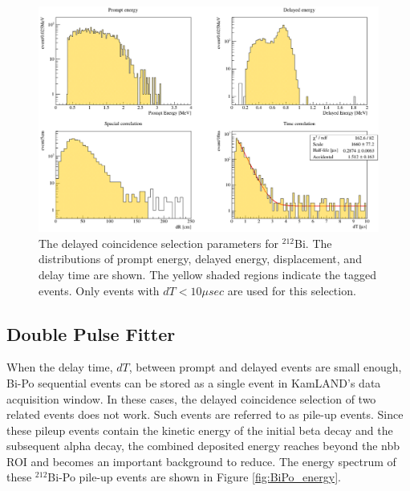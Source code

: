 \begin{figure}[htb]
	\centering
	\includegraphics[scale=0.45]{bi212.png}
	\caption{The delayed coincidence selection parameters for $^{212}$Bi. The distributions of prompt energy, delayed energy, displacement, and delay time are shown. The yellow shaded regions indicate the tagged events. Only events with $dT<10\mu sec$ are used for this selection.}
	\label{fig:BiPo212}
\end{figure}
\subsection*{Double Pulse Fitter}
\label{sec:dpfit}
When the delay time, $dT$, between prompt and delayed events are small enough, Bi-Po sequential events can be stored as a single event in KamLAND's data acquisition window. In these cases, the delayed coincidence selection of two related events does not work. Such events are referred to as pile-up events. Since these pileup events contain the kinetic energy of the initial beta decay and the subsequent alpha decay, the combined deposited energy reaches beyond the \0nbb ROI and becomes an important background to reduce. The energy spectrum of these $^{212}$Bi-Po pile-up events are shown in Figure \ref{fig:BiPo_energy}.

